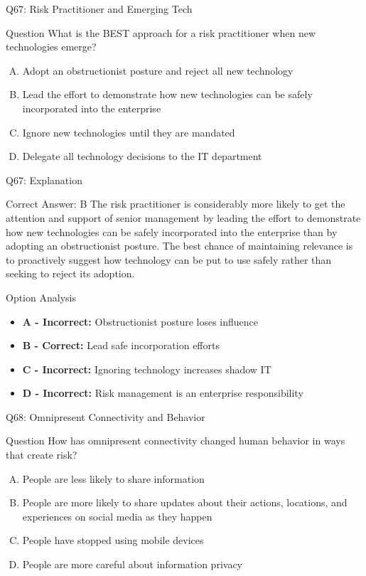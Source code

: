 \documentclass{beamer}
\begin{document}
	\begin{frame}{Q67: Risk Practitioner and Emerging Tech}
		\begin{block}{Question}
			What is the BEST approach for a risk practitioner when new technologies emerge?
		\end{block}
		\begin{enumerate}[(A)]
			\item Adopt an obstructionist posture and reject all new technology
			\item Lead the effort to demonstrate how new technologies can be safely incorporated into the enterprise
			\item Ignore new technologies until they are mandated
			\item Delegate all technology decisions to the IT department
		\end{enumerate}
	\end{frame}
	
	\begin{frame}{Q67: Explanation}
		\begin{block}{Correct Answer: B}
			The risk practitioner is considerably more likely to get the attention and support of senior management by leading the effort to demonstrate how new technologies can be safely incorporated into the enterprise than by adopting an obstructionist posture. The best chance of maintaining relevance is to proactively suggest how technology can be put to use safely rather than seeking to reject its adoption.
		\end{block}
		\begin{block}{Option Analysis}
			\begin{itemize}
				\item \textbf{A - Incorrect:} Obstructionist posture loses influence
				\item \textbf{B - Correct:} Lead safe incorporation efforts
				\item \textbf{C - Incorrect:} Ignoring technology increases shadow IT
				\item \textbf{D - Incorrect:} Risk management is an enterprise responsibility
			\end{itemize}
		\end{block}
	\end{frame}
	
	\begin{frame}{Q68: Omnipresent Connectivity and Behavior}
		\begin{block}{Question}
			How has omnipresent connectivity changed human behavior in ways that create risk?
		\end{block}
		\begin{enumerate}[(A)]
			\item People are less likely to share information
			\item People are more likely to share updates about their actions, locations, and experiences on social media as they happen
			\item People have stopped using mobile devices
			\item People are more careful about information privacy
		\end{enumerate}
	\end{frame}
	
\end{document}
